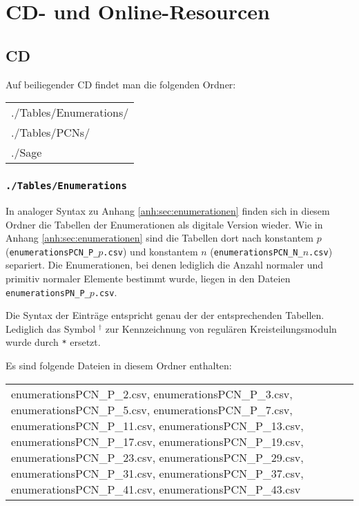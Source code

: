 \chapter{CD- und Online-Resourcen}
\newcommand{\normalcomma}{{\normalfont ,} }

\section{CD}
\label{anh:sec:cd}
Auf beiliegender CD findet man die folgenden Ordner:

\begin{tabular}{>{\ttfamily}l}
  ./Tables/Enumerations/ \\
  ./Tables/PCNs/ \\
  ./Sage
\end{tabular}

\subsection{\texttt{./Tables/Enumerations}}

In analoger Syntax zu Anhang \ref{anh:sec:enumerationen} finden sich in diesem
Ordner die Tabellen der Enumerationen als digitale Version wieder.
Wie in Anhang \ref{anh:sec:enumerationen} sind die Tabellen dort nach konstantem
$p$ (\texttt{enumerationsPCN\_P\_$p$.csv}) und konstantem $n$ 
(\texttt{enumerationsPCN\_N\_$n$.csv}) separiert. Die Enumerationen, bei denen
lediglich die Anzahl normaler und primitiv normaler Elemente bestimmt wurde,
liegen in den Dateien \texttt{enumerationsPN\_P\_$p$.csv}.

Die Syntax der Einträge entspricht genau der der entsprechenden 
Tabellen. Lediglich das Symbol $^\dagger$ zur Kennzeichnung von regulären
Kreisteilungsmoduln wurde durch \texttt{*} ersetzt.

Es sind folgende Dateien in diesem Ordner enthalten:

\begin{tabular}{>{\small\ttfamily}p{\textwidth}}
enumerationsPCN\_P\_2.csv\normalcomma
enumerationsPCN\_P\_3.csv\normalcomma
enumerationsPCN\_P\_5.csv\normalcomma
enumerationsPCN\_P\_7.csv\normalcomma
enumerationsPCN\_P\_11.csv\normalcomma
enumerationsPCN\_P\_13.csv\normalcomma
enumerationsPCN\_P\_17.csv\normalcomma
enumerationsPCN\_P\_19.csv\normalcomma
enumerationsPCN\_P\_23.csv\normalcomma
enumerationsPCN\_P\_29.csv\normalcomma
enumerationsPCN\_P\_31.csv\normalcomma
enumerationsPCN\_P\_37.csv\normalcomma
enumerationsPCN\_P\_41.csv\normalcomma
enumerationsPCN\_P\_43.csv
\end{tabular}

